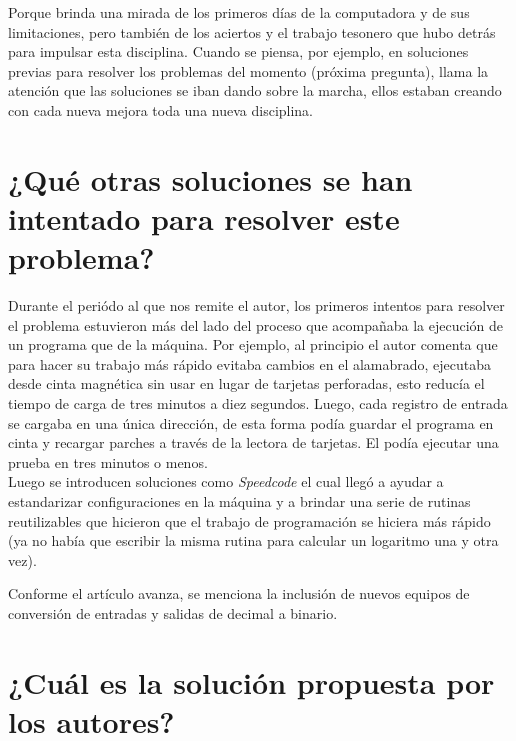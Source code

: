 Porque brinda una mirada de los primeros días de la computadora y de sus limitaciones, pero también de los aciertos y el trabajo tesonero que hubo detrás para impulsar esta disciplina. Cuando se piensa, por ejemplo, en soluciones previas para resolver los problemas del momento (próxima pregunta), llama la atención que las soluciones se iban dando sobre la marcha, ellos estaban creando con cada nueva mejora toda una nueva disciplina. 

\section{¿Qué otras soluciones se han intentado para resolver este problema?}

Durante el periódo al que nos remite el autor, los primeros intentos para resolver el problema estuvieron más del lado del proceso que acompañaba la ejecución de un programa que de la máquina. Por ejemplo, al principio el autor comenta que para hacer su trabajo más rápido evitaba cambios en el alamabrado, ejecutaba desde cinta magnética sin usar en lugar de tarjetas perforadas, esto reducía el tiempo de carga de tres minutos a diez segundos. Luego, cada registro de entrada se cargaba en una única dirección, de esta forma podía guardar el programa en cinta y recargar parches a través de la lectora de tarjetas. El podía ejecutar una prueba en tres minutos o menos.\\

Luego se introducen soluciones como \textit{Speedcode} el cual llegó a ayudar a estandarizar configuraciones en la máquina y a brindar una serie de rutinas reutilizables que hicieron que el trabajo de programación se hiciera más rápido (ya no había que escribir la misma rutina para calcular un logaritmo una y otra vez).

Conforme el artículo avanza, se menciona la inclusión de nuevos equipos de conversión de entradas y salidas de decimal a binario.
     

\section{¿Cuál es la solución propuesta por los autores?}

